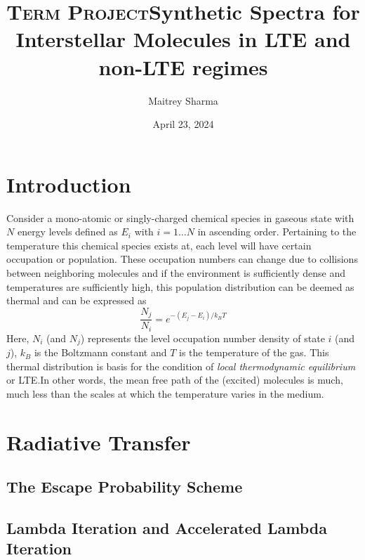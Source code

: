\documentclass{article}
\title{\textsc{Term Project}}
\title{\textbf{Synthetic Spectra for Interstellar
        Molecules in LTE and non-LTE regimes}}
\author{Maitrey Sharma}
\date{April 23, 2024}
\begin{document}
\maketitle
\begin{abstract}

\end{abstract}
\section{Introduction}
Consider a mono-atomic or singly-charged chemical species in gaseous state with
\(N\) energy levels defined as \(E_i\) with \(i = 1 \ldots N\) in ascending
order. Pertaining to the temperature this chemical species exists at, each
level will have certain occupation or population. These occupation numbers can
change due to collisions between neighboring molecules and if the environment
is sufficiently dense and temperatures are sufficiently high, this population
distribution can be deemed as thermal and can be expressed as
\begin{equation}
    \dfrac{N_j}{N_i} = {e}^{-(E_j - E_i)/k_B T}
\end{equation}
Here, \(N_i\) (and \(N_j\)) represents the level occupation number density of state
\(i\) (and \(j\)), \(k_B\) is the Boltzmann constant and \(T\) is the temperature of the
gas. This thermal distribution is basis for the condition of \textit{local thermodynamic
    equilibrium} or LTE.\@ In other words, the mean free path of the (excited) molecules
is much, much less than the scales at which the temperature varies in the medium.

\section{Radiative Transfer}
\subsection{The Escape Probability Scheme}
\subsection{Lambda Iteration and Accelerated Lambda Iteration}
\end{document}
